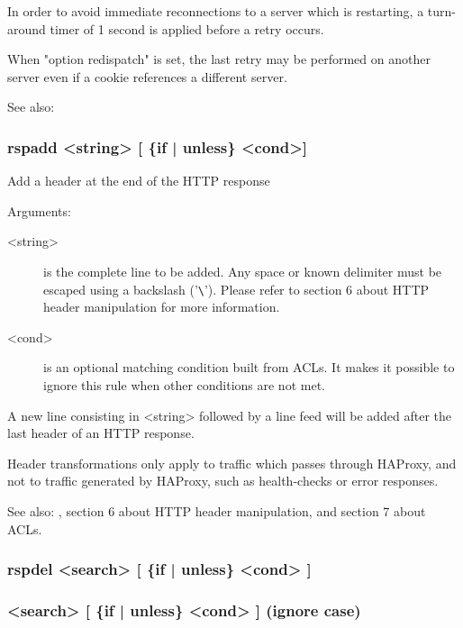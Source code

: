   In order to avoid immediate reconnections to a server which is restarting,
  a turn-around timer of 1 second is applied before a retry occurs.

  When "option redispatch" is set, the last retry may be performed on another
  server even if a cookie references a different server.

  See also: 

\subsubsection[rspadd]{rspadd <string> [ \{if | unless\} <cond>] }


  Add a header at the end of the HTTP response


  Arguments:
  \begin{description}
  \item[<string>] is the complete line to be added. Any space or known delimiter
              must be escaped using a backslash ('\verb|\|'). Please refer to section
              6 about HTTP header manipulation for more information.

  \item[<cond>] is an optional matching condition built from ACLs. It makes it
              possible to ignore this rule when other conditions are not met.
  \end{description}

  A new line consisting in <string> followed by a line feed will be added after
  the last header of an HTTP response.

  Header transformations only apply to traffic which passes through HAProxy,
  and not to traffic generated by HAProxy, such as health-checks or error
  responses.

  See also: , section 6 about HTTP header manipulation, and section 7
            about ACLs.

\subsubsection[rspdel]{rspdel  <search> [ \{if | unless\} <cond> ]}
\subsubsection[rspidel]{<search> [ \{if | unless\} <cond> ]  (ignore case)}

